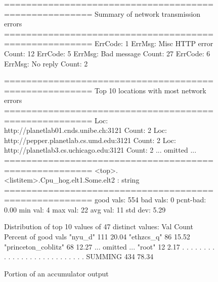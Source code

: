  



\begin{figure}[th]
\centering
\begin{scodebox}
======================================================
Summary of network transmission errors
======================================================
ErrCode: 1      ErrMsg: Misc HTTP error Count: 12
ErrCode: 5      ErrMsg: Bad message     Count: 27
ErrCode: 6      ErrMsg: No reply        Count: 2

======================================================
Top 10 locations with most network errors
======================================================
Loc: http://planetlab01.cnds.unibe.ch:3121    Count: 2
Loc: http://pepper.planetlab.cs.umd.edu:3121  Count: 2
Loc: http://planetlab3.cs.uchicago.edu:3121   Count: 2
... omitted ...
======================================================
<top>.<listitem>.Cpu_hog.elt1.Some.elt2 : string
======================================================
good vals: 554        bad vals: 0      pcnt-bad: 0.00%
min val: 4   max val: 22   avg val: 11   std dev: 5.29   

Distribution of top 10 values of 47 distinct values:
  Val                Count        Percent of good vals
"nyu_d"              111                        20.04%
"ethzcs_q"           86                         15.52%
"princeton_coblitz"  68                         12.27%
... omitted ...
"root"               12                          2.17%
. . . . . . . . . . . . . . . . . . . . . . . . . . . 
SUMMING              434                        78.34%
\end{scodebox}
\caption{Portion of an accumulator output} \label{fig:acc}
\end{figure} 



